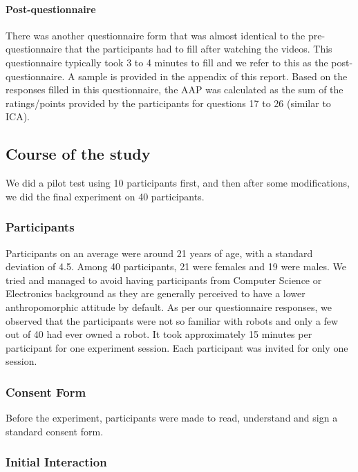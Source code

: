 \documentclass[a4,twocolumn,10pt]{article}
\begin{document}
\paragraph{Post-questionnaire}

There was another questionnaire form that was almost identical to the
pre-questionnaire that the participants had to fill after watching the videos.
This questionnaire typically took 3 to 4 minutes to fill and we refer to this as
the post-questionnaire. A sample is provided in the appendix of this report.
Based on the responses filled in this questionnaire, the AAP was calculated as
the sum of the ratings/points provided by the participants for questions 17 to
26 (similar to ICA).


\subsection{Course of the study}

We did a pilot test using 10 participants first, and then after some
modifications, we did the final experiment on 40 participants.

\subsubsection{Participants}

Participants on an average were around 21 years of age, with a standard
deviation of 4.5. Among 40 participants, 21 were females and 19 were males.  We
tried and managed to avoid having participants from Computer Science or
Electronics background as they are generally perceived to have a lower
anthropomorphic attitude by default. As per our questionnaire responses, we
observed that the participants were not so familiar with robots and only a few
out of 40 had ever owned a robot.  It took approximately 15 minutes per
participant for one experiment session.  Each participant was invited for only
one session. 

\subsubsection{Consent Form}

Before the experiment, participants were made to read, understand and sign a
standard consent form.

\subsubsection{Initial Interaction}
\end{document}

